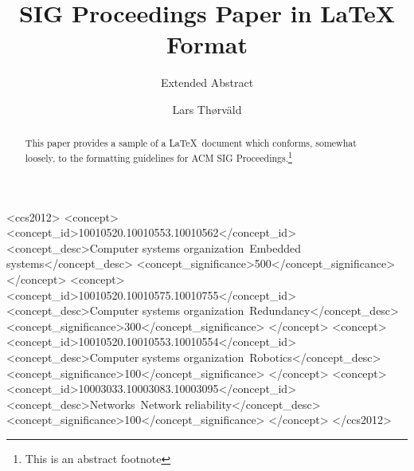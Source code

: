 \documentclass[sigconf]{acmart}
\theoremstyle{definition}
\begin{document}
\title{SIG Proceedings Paper in LaTeX Format}
\subtitle{Extended Abstract}

\author{Lars Th{\o}rv{\"a}ld}

\renewcommand{\shortauthors}{B. Trovato et al.}


\begin{abstract}
This paper provides a sample of a \LaTeX\ document which conforms,
somewhat loosely, to the formatting guidelines for
ACM SIG Proceedings.\footnote{This is an abstract footnote}
\end{abstract}

%
%
\begin{CCSXML}
<ccs2012>
 <concept>
  <concept_id>10010520.10010553.10010562</concept_id>
  <concept_desc>Computer systems organization~Embedded systems</concept_desc>
  <concept_significance>500</concept_significance>
 </concept>
 <concept>
  <concept_id>10010520.10010575.10010755</concept_id>
  <concept_desc>Computer systems organization~Redundancy</concept_desc>
  <concept_significance>300</concept_significance>
 </concept>
 <concept>
  <concept_id>10010520.10010553.10010554</concept_id>
  <concept_desc>Computer systems organization~Robotics</concept_desc>
  <concept_significance>100</concept_significance>
 </concept>
 <concept>
  <concept_id>10003033.10003083.10003095</concept_id>
  <concept_desc>Networks~Network reliability</concept_desc>
  <concept_significance>100</concept_significance>
 </concept>
</ccs2012>
\end{CCSXML}





\maketitle
\end{document}
